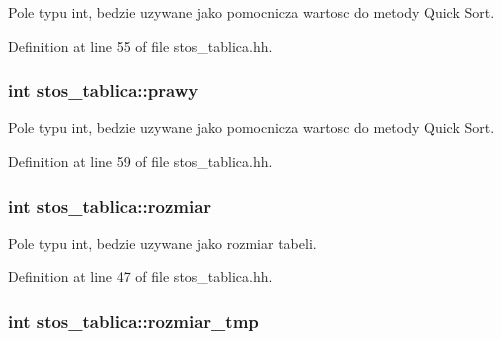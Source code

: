 Pole typu int, bedzie uzywane jako pomocnicza wartosc do metody Quick Sort. 



Definition at line 55 of file stos\-\_\-tablica.\-hh.

\hypertarget{classstos__tablica_aab32beac5ab0f185fb27492736798749}{
\subsubsection[{prawy}]{\setlength{\rightskip}{0pt plus 5cm}int stos\-\_\-tablica\-::prawy\hspace{0.3cm}{\ttfamily [private]}}}\label{classstos__tablica_aab32beac5ab0f185fb27492736798749}


Pole typu int, bedzie uzywane jako pomocnicza wartosc do metody Quick Sort. 



Definition at line 59 of file stos\-\_\-tablica.\-hh.

\hypertarget{classstos__tablica_aa9c1d33bd477174602d2632c74ebea9c}{
\subsubsection[{rozmiar}]{\setlength{\rightskip}{0pt plus 5cm}int stos\-\_\-tablica\-::rozmiar\hspace{0.3cm}{\ttfamily [private]}}}\label{classstos__tablica_aa9c1d33bd477174602d2632c74ebea9c}


Pole typu int, bedzie uzywane jako rozmiar tabeli. 



Definition at line 47 of file stos\-\_\-tablica.\-hh.

\hypertarget{classstos__tablica_adcfe2091d485a93da47eb9fb6a337b06}{
\subsubsection[{rozmiar\-\_\-tmp}]{\setlength{\rightskip}{0pt plus 5cm}int stos\-\_\-tablica\-::rozmiar\-\_\-tmp\hspace{0.3cm}{\ttfamily [private]}}}\label{classstos__tablica_adcfe2091d485a93da47eb9fb6a337b06}


